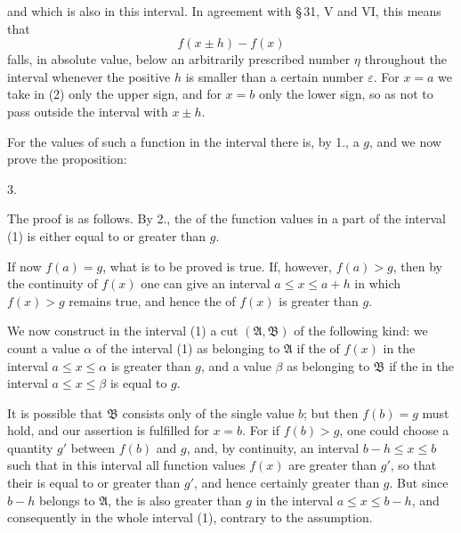 
and which is also  in this interval. In agreement with \S\,31, V and VI, this means that
\begin{equation}
 f(x\pm h)-f(x)
\tag{2}
\end{equation}
falls, in absolute value, below an arbitrarily prescribed number $\eta$ throughout the interval whenever the positive $h$ is smaller than a certain number $\varepsilon$. For $x=a$ we take in (2) only the upper sign, and for $x=b$ only the lower sign, so as not to pass outside the interval with $x\pm h$.

For the values of such a function in the interval there is, by 1., a  $g$, and we now prove the proposition:

3. 

The proof is as follows. By 2., the  of the function values in a part of the interval (1) is either equal to or greater than $g$.

If now $f(a)=g$, what is to be proved is true. If, however, $f(a)>g$, then by the continuity of $f(x)$ one can give an interval $a\le x\le a+h$ in which $f(x)>g$ remains true, and hence the  of $f(x)$ is greater than $g$.

We now construct in the interval (1) a cut $(\mathfrak A,\mathfrak B)$ of the following kind: we count a value $\alpha$ of the interval (1) as belonging to $\mathfrak A$ if the  of $f(x)$ in the interval $a\le x\le \alpha$ is greater than $g$, and a value $\beta$ as belonging to $\mathfrak B$ if the  in the interval $a\le x\le \beta$ is equal to $g$.

It is possible that $\mathfrak B$ consists only of the single value $b$; but then $f(b)=g$ must hold, and our assertion is fulfilled for $x=b$. For if $f(b)>g$, one could choose a quantity $g'$ between $f(b)$ and $g$, and, by continuity, an interval $b-h\le x\le b$ such that in this interval all function values $f(x)$ are greater than $g'$, so that their  is equal to or greater than $g'$, and hence certainly greater than $g$. But since $b-h$ belongs to $\mathfrak A$, the  is also greater than $g$ in the interval $a\le x\le b-h$, and consequently in the whole interval (1), contrary to the assumption.
